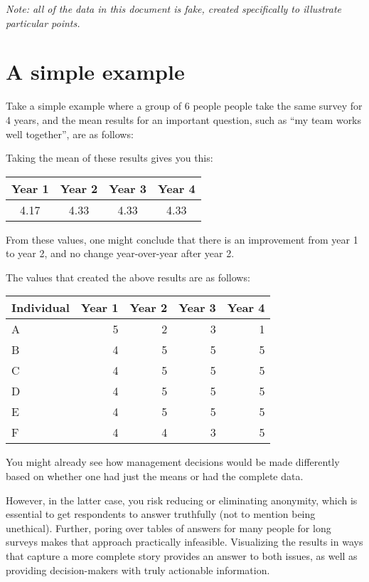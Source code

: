 \documentclass[]{book}
\begin{document}
\emph{Note: all of the data in this document is fake, created
specifically to illustrate particular points.}

\chapter{A simple example}\label{a-simple-example}

Take a simple example where a group of 6 people people take the same
survey for 4 years, and the mean results for an important question, such
as ``my team works well together'', are as follows:

Taking the mean of these results gives you this:

\begin{longtable}[]{@{}cccc@{}}
\toprule
Year 1 & Year 2 & Year 3 & Year 4\tabularnewline
\midrule
\endhead
4.17 & 4.33 & 4.33 & 4.33\tabularnewline
\bottomrule
\end{longtable}

From these values, one might conclude that there is an improvement from
year 1 to year 2, and no change year-over-year after year 2.

The values that created the above results are as follows:

\begin{tabular}{l|r|r|r|r}
\hline
Individual & Year 1 & Year 2 & Year 3 & Year 4\\
\hline
A & 5 & 2 & 3 & 1\\
\hline
B & 4 & 5 & 5 & 5\\
\hline
C & 4 & 5 & 5 & 5\\
\hline
D & 4 & 5 & 5 & 5\\
\hline
E & 4 & 5 & 5 & 5\\
\hline
F & 4 & 4 & 3 & 5\\
\hline
\end{tabular}

You might already see how management decisions would be made differently
based on whether one had just the means or had the complete data.

However, in the latter case, you risk reducing or eliminating anonymity,
which is essential to get respondents to answer truthfully (not to
mention being unethical). Further, poring over tables of answers for
many people for long surveys makes that approach practically infeasible.
Visualizing the results in ways that capture a more complete story
provides an answer to both issues, as well as providing decision-makers
with truly actionable information.
\end{document}
